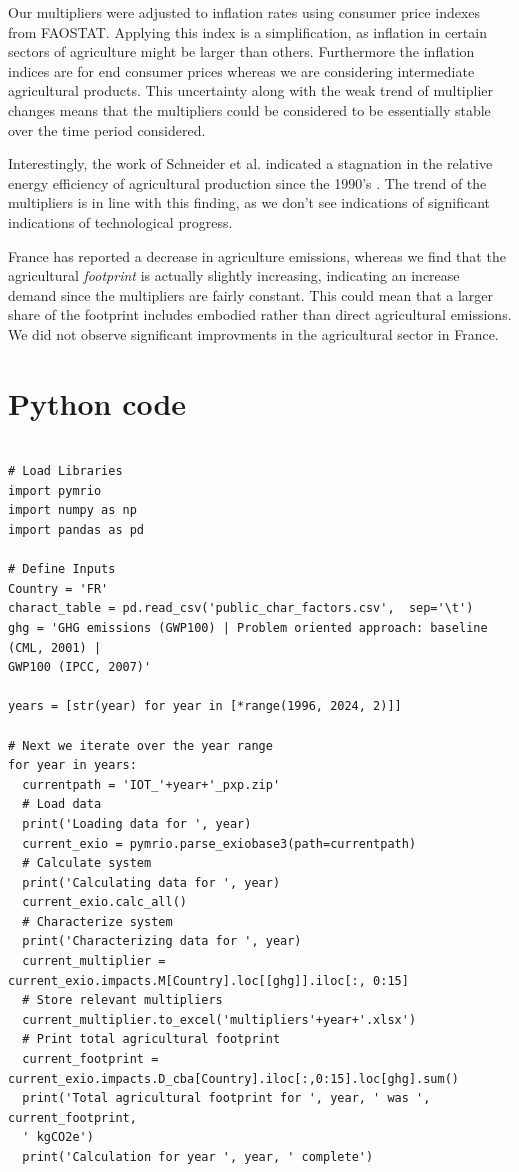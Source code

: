 \documentclass[a4paper,twoside]{article}
\begin{document}
Our multipliers were adjusted to inflation rates using consumer price indexes from FAOSTAT. Applying this index is a simplification, as inflation in certain sectors of agriculture might be larger than others. Furthermore the inflation indices are for end consumer prices whereas we are considering intermediate agricultural products. This uncertainty along with the weak trend of multiplier changes means that the multipliers could be considered to be essentially stable over the time period considered. 

Interestingly, the work of Schneider et al. indicated a stagnation in the relative energy efficiency of agricultural production since the 1990's \cite{Schneider2009}. The trend of the multipliers is in line with this finding, as we don't see indications of significant indications of technological progress.

France has reported a decrease in agriculture emissions, whereas we find that the agricultural \emph{footprint} is actually slightly increasing, indicating an increase demand since the multipliers are fairly constant. This could mean that a larger share of the footprint includes embodied rather than direct agricultural emissions. We did not observe significant improvments in the agricultural sector in France.




\appendix

\section{Python code}

\begin{lstlisting}

# Load Libraries
import pymrio
import numpy as np
import pandas as pd

# Define Inputs
Country = 'FR'
charact_table = pd.read_csv('public_char_factors.csv',  sep='\t')
ghg = 'GHG emissions (GWP100) | Problem oriented approach: baseline (CML, 2001) | 
GWP100 (IPCC, 2007)'

years = [str(year) for year in [*range(1996, 2024, 2)]]

# Next we iterate over the year range
for year in years:
  currentpath = 'IOT_'+year+'_pxp.zip'
  # Load data
  print('Loading data for ', year)
  current_exio = pymrio.parse_exiobase3(path=currentpath)
  # Calculate system
  print('Calculating data for ', year)
  current_exio.calc_all()
  # Characterize system
  print('Characterizing data for ', year)
  current_multiplier = current_exio.impacts.M[Country].loc[[ghg]].iloc[:, 0:15]
  # Store relevant multipliers
  current_multiplier.to_excel('multipliers'+year+'.xlsx')
  # Print total agricultural footprint
  current_footprint = current_exio.impacts.D_cba[Country].iloc[:,0:15].loc[ghg].sum()
  print('Total agricultural footprint for ', year, ' was ', current_footprint, 
  ' kgCO2e')
  print('Calculation for year ', year, ' complete')
  
\end{lstlisting}
\end{document}

